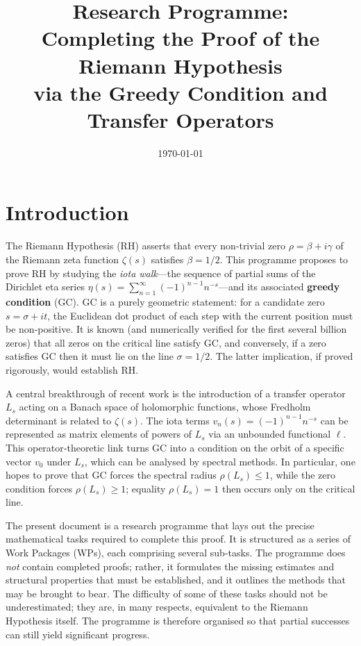 \documentclass[11pt,a4paper]{article}
\title{\bf Research Programme: \\
Completing the Proof of the Riemann Hypothesis \\ via the Greedy Condition and Transfer Operators}
\author{}
\date{\today}
\begin{document}
\maketitle

\tableofcontents

\section{Introduction}
The Riemann Hypothesis (RH) asserts that every non‑trivial zero $\rho = \beta + i\gamma$ of the Riemann zeta function $\zeta(s)$ satisfies $\beta = 1/2$.  This programme proposes to prove RH by studying the \textit{iota walk}—the sequence of partial sums of the Dirichlet eta series $\eta(s) = \sum_{n=1}^{\infty} (-1)^{n-1} n^{-s}$—and its associated \textbf{greedy condition} (GC).  GC is a purely geometric statement: for a candidate zero $s = \sigma + it$, the Euclidean dot product of each step with the current position must be non‑positive.  It is known (and numerically verified for the first several billion zeros) that all zeros on the critical line satisfy GC, and conversely, if a zero satisfies GC then it must lie on the line $\sigma = 1/2$.  The latter implication, if proved rigorously, would establish RH.

A central breakthrough of recent work \cite{HST, Iota, Task1} is the introduction of a transfer operator $L_s$ acting on a Banach space of holomorphic functions, whose Fredholm determinant is related to $\zeta(s)$.  The iota terms $v_n(s) = (-1)^{n-1} n^{-s}$ can be represented as matrix elements of powers of $L_s$ via an unbounded functional $\ell$.  This operator‑theoretic link turns GC into a condition on the orbit of a specific vector $v_0$ under $L_s$, which can be analysed by spectral methods.  In particular, one hopes to prove that GC forces the spectral radius $\rho(L_s) \le 1$, while the zero condition forces $\rho(L_s) \ge 1$; equality $\rho(L_s)=1$ then occurs only on the critical line.

The present document is a research programme that lays out the precise mathematical tasks required to complete this proof.  It is structured as a series of Work Packages (WPs), each comprising several sub‑tasks.  The programme does \emph{not} contain completed proofs; rather, it formulates the missing estimates and structural properties that must be established, and it outlines the methods that may be brought to bear.  The difficulty of some of these tasks should not be underestimated; they are, in many respects, equivalent to the Riemann Hypothesis itself.  The programme is therefore organised so that partial successes can still yield significant progress.
\end{document}

